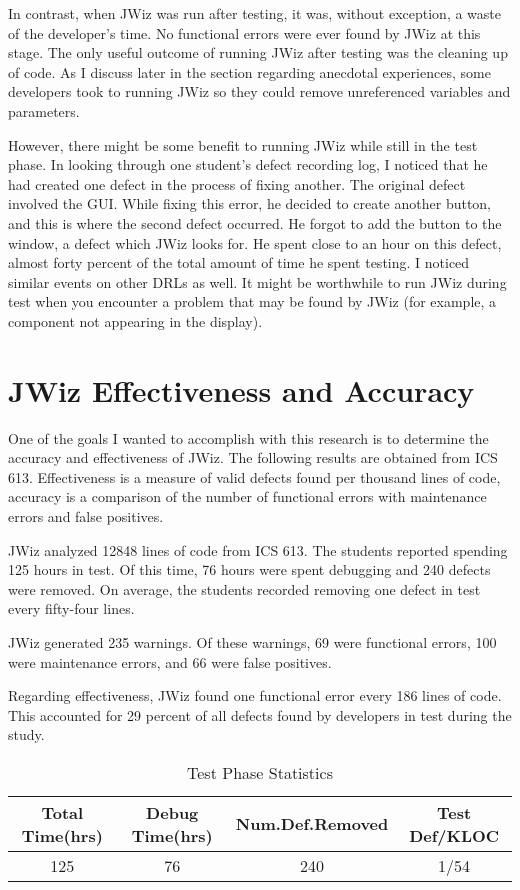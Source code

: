 In contrast, when JWiz was run after testing, it was, without exception, a
waste of the developer's time.  No functional errors were ever found by JWiz
at this stage.  The only useful outcome of running JWiz after testing was
the cleaning up of code.  As I discuss later in the section regarding
anecdotal experiences, some developers took to running JWiz so they could
remove unreferenced variables and parameters.

However, there might be some benefit to running JWiz while still in the
test phase.  In looking through one student's defect recording log, I noticed
that he had created one defect in the process of fixing another.  The
original defect involved the GUI.  While fixing this error, he decided
to create another button, and this is where the second defect occurred.  He
forgot to add the button to the window, a defect which JWiz looks for.  He
spent close to an hour on this defect, almost forty percent of the total
amount of time he spent testing.  I noticed similar events on other DRLs as
well.  It might be worthwhile to run JWiz during test when you encounter a
problem that may be found by JWiz (for example, a component not appearing
in the display).

\section{JWiz Effectiveness and Accuracy}
One of the goals I wanted to accomplish with this research is to determine
the accuracy and effectiveness of JWiz.  The following results are obtained 
from ICS 613.
\newpage
Effectiveness is a measure of valid defects found per thousand lines of
code, accuracy is a comparison of the number of functional errors with
maintenance errors and false positives. 

JWiz analyzed 12848 lines of code from ICS 613.  The students reported
spending 125 hours in test.  Of this time, 76 hours were spent debugging
and 240 defects were removed.  On average, the students recorded removing
one defect in test every fifty-four lines.

JWiz generated 235 warnings.  Of these warnings, 69 were functional
errors, 100 were maintenance errors, and 66 were false positives. 

Regarding effectiveness, JWiz found one functional error every 186 lines of
code.  This accounted for 29 percent of all defects found by developers in
test during the study.

\begin{table}[htpb]
  \caption{Test Phase Statistics}
  \begin{center}
  \begin{tabular}{|c|c|c|c|}
    \hline Total Time(hrs) & Debug Time(hrs) & Num.Def.Removed & Test Def/KLOC \\ \hline \hline
    125 & 76 & 240 & 1/54 \\ \hline
   \end{tabular}
  \end{center}
 \label{Test Phase Statistics}
\end{table}

